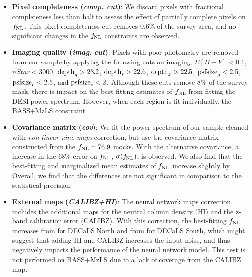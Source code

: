 \begin{itemize}[itemindent=*]
\item \textbf{Pixel completeness (\textit{comp. cut})}: We discard pixels with fractional completeness less than half to assess the effect of partially complete pixels on $f_{\rm NL}$. This pixel completeness cut removes $0.6\%$ of the survey area, and no significant changes in the $f_{\rm NL}$ constraints are observed.

\item \textbf{Imaging quality (\textit{imag. cut})}: Pixels with poor photometry are removed from our sample by applying the following cuts on imaging; $E[B-V]<0.1$, $nStar < 3000$, ${\rm depth}_{g} > 23.2$, ${\rm depth}_{r} > 22.6$, ${\rm depth}_{z} > 22.5$, ${\rm psfsize}_{g}<2.5$, ${\rm psfsize}_{r}<2.5$, and ${\rm psfsize}_{z}<2$. Although these cuts remove $8\%$ of the survey mask, there is  impact on the best-fitting estimates of $f_{\rm NL}$ from fitting the DESI power spectrum. However, when each region is fit individually, the BASS+MzLS constraint   

\item \textbf{Covariance matrix (\textit{cov})}: We fit the power spectrum of our sample cleaned with \textit{non-linear nine maps} correction, but use the covariance matrix constructed from the $f_{\rm NL}=76.9$ mocks. With the alternative covariance, a  increase in the 68\% error on $f_{\rm NL}$, $\sigma(f_{\rm NL})$, is observed. We also find that the best-fitting and marginalized mean estimates of $f_{\rm NL}$ increase slightly by . Overall, we find that the differences are not significant in comparison to the statistical precision.

\item \textbf{External maps (\textit{CALIBZ+HI})}: The neural network  maps correction includes the additional maps for the neutral column density (HI) and the z-band calibration error (CALIBZ). With this correction, the best-fitting $f_{\rm NL}$ increases from  for DECaLS North and from  for DECaLS South, which might suggest that adding HI and CALIBZ increases the input noise, and thus negatively impacts the performance of the neural network model. This test is not performed on BASS+MzLS due to a lack of coverage from the CALIBZ map. 


\end{itemize}
